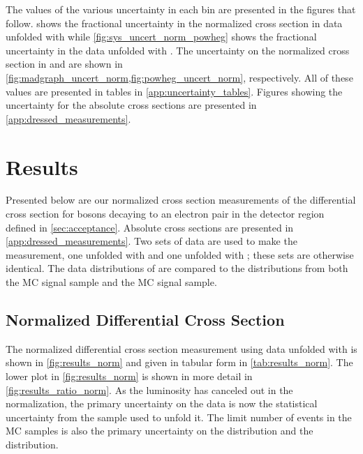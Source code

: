 The values of the various uncertainty in each \phistar bin are presented in the
figures that follow.  shows the fractional
uncertainty in the normalized \phistar cross section in data unfolded with
\MADGRAPH while \cref{fig:sys_uncert_norm_powheg} shows the fractional
uncertainty in the data unfolded with \POWHEG. The uncertainty on the
normalized \phistar cross section in \MADGRAPH and \POWHEG are shown in
\cref{fig:madgraph_uncert_norm,fig:powheg_uncert_norm},
respectively. All of these values are presented in tables in
\cref{app:uncertainty_tables}. Figures showing the uncertainty for the
absolute \phistar cross sections are presented in
\cref{app:dressed_measurements}.










\section{Results}
\label{sec:results}

Presented below are our normalized cross section measurements of the
differential \phistar cross section for \Z bosons decaying to an electron pair
in the detector region defined in \cref{sec:acceptance}. Absolute cross
sections are presented in \cref{app:dressed_measurements}. Two sets of data
are used to make the measurement, one unfolded with \MADGRAPH and one unfolded
with \POWHEG; these sets are otherwise identical. The data distributions of
\phistar are compared to the distributions from both the \MADGRAPH MC signal
sample and the \POWHEG MC signal sample.

\subsection{Normalized Differential Cross Section}
\label{ssec:results_norm}

The normalized differential cross section measurement using data unfolded with
\MADGRAPH is shown in \cref{fig:results_norm} and given in tabular form in
\cref{tab:results_norm}. The lower plot in \cref{fig:results_norm} is
shown in more detail in \cref{fig:results_ratio_norm}. As the luminosity
has canceled out in the normalization, the primary uncertainty on the data is
now the statistical uncertainty from the \MADGRAPH sample used to unfold it.
The limit number of events in the MC samples is also the primary uncertainty on
the \MADGRAPH distribution and the \POWHEG distribution.

